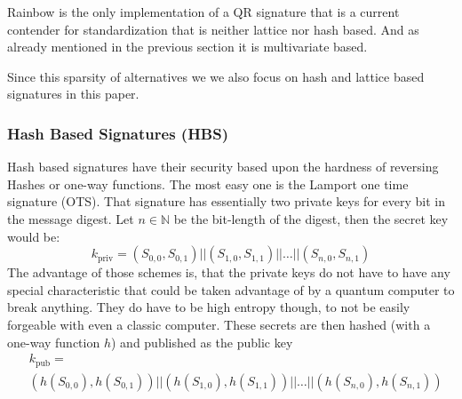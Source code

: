 \documentclass[conference]{IEEEtran}
\begin{document}
Rainbow is the only implementation of a QR signature that is a current contender for standardization that is neither lattice nor hash based.
And as already mentioned in the previous section it is multivariate based.

Since this sparsity of alternatives we we also focus on hash and lattice based signatures in this paper.

\subsubsection{Hash Based Signatures (HBS)}\label{HBS}
Hash based signatures have their security based upon the hardness of reversing Hashes or one-way functions.
The most easy one is the Lamport one time signature (OTS).\cite{QR_algs} 
That signature has essentially two private keys for every bit in the message digest. 
Let $n \in \mathbb{N}$ be the bit-length of the digest, then the secret key would be: \[k_\text{priv}= (S_{0,0},S_{0,1}) || (S_{1,0},S_{1,1})|| \dots || (S_{n,0},S_{n,1})\]
The advantage of those schemes is, that the private keys do not have to have any special characteristic that could be taken advantage of by a quantum computer to break anything.
They do have to be high entropy though, to not be easily forgeable with even a classic computer. 
These secrets are then hashed (with a one-way function $h$) and published as the public key \begin{align*}
    &k_\text{pub}= \\ &(h(S_{0,0}),h(S_{0,1})) || (h(S_{1,0}),h(S_{1,1}))|| \dots || (h(S_{n,0}),h(S_{n,1}))
\end{align*}
\end{document}
